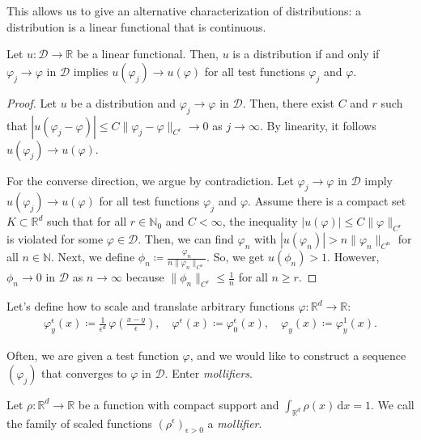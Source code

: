 This allows us to give an alternative characterization of distributions: a distribution is a linear functional that is {continuous}.

\begin{lemma}
    Let \(u: \mathcal{D} \to \mathbb{R}\) be a linear functional. Then, \(u\) is a {distribution} if and only if \( \varphi_j \to \varphi \) in \(\mathcal{D}\) implies \(u(\varphi_j) \to u(\varphi)\) for all test functions \(\varphi_j\) and \( \varphi \).
\end{lemma}

\begin{proof}
    Let \(u\) be a distribution and \(\varphi_j \to \varphi \) in \(\mathcal{D}\). Then, there exist \(C\) and \(r\) such that \(|u(\varphi_j -\varphi)| \leq C \lVert \varphi_j - \varphi \rVert_{C^r} \to 0\) as \(j \to \infty \). By linearity, it follows \(u(\varphi_j) \to u(\varphi)\).

    For the converse direction, we argue by contradiction. Let \( \varphi_j \to \varphi \) in \(\mathcal{D}\) imply \(u(\varphi_j) \to u(\varphi)\) for all test functions \(\varphi_j\) and \(\varphi \). Assume there is a compact set \(K \subset \mathbb{R}^d\) such that for all \(r \in \mathbb{N}_0\) and \(C < \infty \), the inequality \(|u(\varphi)| \leq C \lVert\varphi\rVert_{C^r}\) is violated for some \(\varphi \in \mathcal{D}\). Then, we can find \(\varphi_n\) with \(|u(\varphi_n)| > n \lVert \varphi_n \rVert_{C^n}\) for all \(n \in \mathbb{N}\). Next, we define \(\phi_n \coloneqq \frac{\varphi_n}{n \lVert \varphi_n \rVert_{C^n}}\). So, we get \(u(\phi_n) > 1\). However, \(\phi_n \to 0\) in \(\mathcal{D}\) as \(n \to {\infty}\) because \(\lVert \phi_n \rVert_{C^r} \leq \frac{1}{n}\) for all \(n \geq r\).
\end{proof}

Let's define how to scale and translate arbitrary functions \(\varphi: \mathbb{R}^d \to \mathbb{R}\):
\begin{align*}
    \varphi^\epsilon_y(x) \coloneqq \frac{1}{\epsilon^d} \, \varphi\left(\frac{x-y}{\epsilon}\right), \quad \varphi^\epsilon(x) \coloneqq \varphi^\epsilon_0(x), \quad \varphi_y(x) \coloneqq \varphi^1_y(x).
\end{align*} 

Often, we are given a test function \({\varphi}\), and we would like to construct a sequence 
\((\varphi_j)\) that converges to \( \varphi \) in \( \mathcal{D} \).
Enter \emph{mollifiers}. 

\begin{definition}[Mollifier]
    Let \(\rho: \mathbb{R}^d \to \mathbb{R}\) be a function with compact support and \(\int_{\mathbb{R}^d} \rho(x) \, \mathrm{d}x = 1\). We call the family of scaled functions \({(\rho^\epsilon)}_{\epsilon > 0}\) a \emph{mollifier}.
\end{definition}

